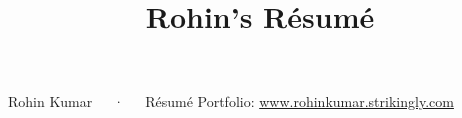 \documentclass[11pt, a4paper]{awesome-cv}
\title{Rohin's Résumé}
\begin{document}
\makecvheader[L]

\makecvfooter
  {Rohin Kumar~~~·~~~Résumé}
  {Portfolio: \url{www.rohinkumar.strikingly.com}}
  {\thepage}


% 


\newpage
% 







%


\end{document}
